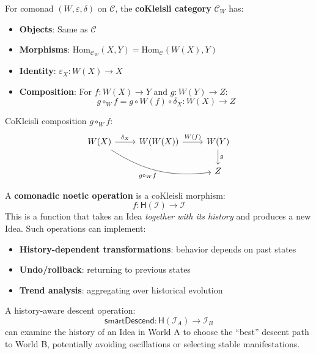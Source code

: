 \begin{definition}
\label{def:cokleisli}
For comonad $(W, \varepsilon, \delta)$ on $\mathcal{C}$, the \textbf{coKleisli category}
$\mathcal{C}_W$ has:
\begin{itemize}
  \item \textbf{Objects}: Same as $\mathcal{C}$
  \item \textbf{Morphisms}: $\mathrm{Hom}_{\mathcal{C}_W}(X, Y) = \mathrm{Hom}_{\mathcal{C}}(W(X), Y)$
  \item \textbf{Identity}: $\varepsilon_X : W(X) \to X$
  \item \textbf{Composition}: For $f : W(X) \to Y$ and $g : W(Y) \to Z$:
  \[
    g \circ_W f = g \circ W(f) \circ \delta_X : W(X) \to Z
  \]
\end{itemize}
\end{definition}

\begin{proposition}
\label{prop:cokleisli-diagram}
CoKleisli composition $g \circ_W f$:
\[
\begin{tikzcd}
  W(X) \arrow[r, "\delta_X"] \arrow[drr, bend right=20, "g \circ_W f"']
  & W(W(X)) \arrow[r, "W(f)"]
  & W(Y) \arrow[d, "g"] \\
  && Z
\end{tikzcd}
\]
\end{proposition}

\begin{definition}
\label{def:comonadic-noetic-ops}
A \textbf{comonadic noetic operation} is a coKleisli morphism:
\[
  f : \mathsf{H}(\mathcal{I}) \to \mathcal{I}
\]
This is a function that takes an Idea \emph{together with its history} and produces
a new Idea. Such operations can implement:
\begin{itemize}
  \item \textbf{History-dependent transformations}: behavior depends on past states
  \item \textbf{Undo/rollback}: returning to previous states
  \item \textbf{Trend analysis}: aggregating over historical evolution
\end{itemize}
\end{definition}

\begin{example}
\label{ex:history-aware-descent}
A history-aware descent operation:
\[
  \mathsf{smartDescend} : \mathsf{H}(\mathcal{I}_A) \to \mathcal{I}_B
\]
can examine the history of an Idea in World A to choose the ``best'' descent path
to World B, potentially avoiding oscillations or selecting stable manifestations.
\end{example}

